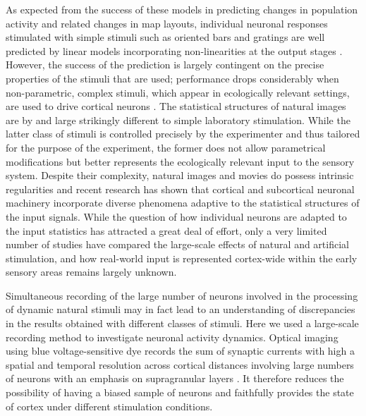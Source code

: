 As expected from the success of these models in predicting changes in
population activity and related changes in map layouts, individual neuronal
responses stimulated with simple stimuli such as oriented bars and gratings
are well predicted by linear models incorporating non-linearities at the
output stages \citep{chichilnisky2001a, touryan2002a, rust2005b}. However,
the success of the prediction is largely contingent on the precise
properties of the stimuli that are used; performance drops considerably
when non-parametric, complex stimuli, which appear in ecologically relevant
settings, are used to drive cortical neurons \citep{smyth2003a, david2004a,
david2005a}.  The statistical structures of natural images are by and large
strikingly different to simple laboratory stimulation. While the latter
class of stimuli is controlled precisely by the experimenter and thus
tailored for the purpose of the experiment, the former does not allow
parametrical modifications but better represents the ecologically relevant
input to the sensory system. Despite their complexity, natural images and
movies do possess intrinsic regularities and recent research has shown that
cortical \citep{felsen2005c, mante2005a} and subcortical \citep{dan1996a}
neuronal machinery incorporate diverse phenomena adaptive to the
statistical structures of the input signals. While the question of how
individual neurons are adapted to the input statistics has attracted a
great deal of effort, only a very limited number of studies have compared
the large-scale effects of natural and artificial stimulation, and how
real-world input is represented cortex-wide within the early sensory areas
remains largely unknown.
 
Simultaneous recording of the large number of neurons involved in the
processing of dynamic natural stimuli may in fact lead to an understanding
of discrepancies in the results obtained with different classes of stimuli.
Here we used a large-scale recording method to investigate neuronal
activity dynamics. Optical imaging using blue voltage-sensitive dye records
the sum of synaptic currents with high a spatial and temporal resolution
across cortical distances involving large numbers of neurons with an
emphasis on supragranular layers \citep{grinvald1984a,arieli1996a,
shoham1999a, petersen2003b, jancke2004a, sharon2007a, ferezou2007a}. It
therefore reduces the possibility of having a biased sample of neurons and
faithfully provides the state of cortex under different stimulation
conditions.
 
